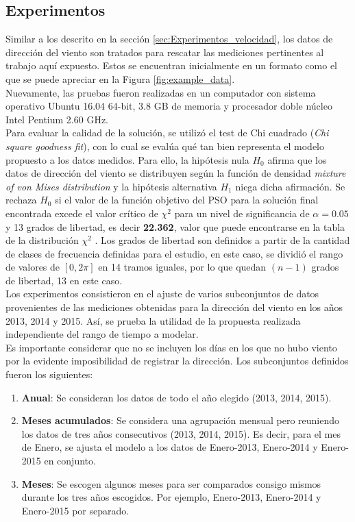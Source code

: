 \subsection{Experimentos}
Similar a los descrito en la sección \ref{sec:Experimentos_velocidad}, los datos de dirección del viento son tratados para rescatar las mediciones pertinentes al trabajo aquí expuesto. Estos se encuentran inicialmente en un formato como el que se puede apreciar en la Figura \ref{fig:example_data}.\\
Nuevamente, las pruebas fueron realizadas en un computador con sistema operativo Ubuntu 16.04 64-bit, 3.8 GB de memoria y procesador doble núcleo Intel Pentium 2.60 GHz.\\
Para evaluar la calidad de la solución, se utilizó el test de Chi cuadrado (\emph{Chi square goodness fit})\cite{goodFitTest}, con lo cual se evalúa qué tan bien representa el modelo propuesto a los datos medidos. Para ello, la hipótesis nula $H_0$ afirma que los datos de dirección del viento se distribuyen según la función de densidad \emph{mixture of von Mises distribution} y la hipótesis alternativa $H_1$ niega dicha afirmación. Se rechaza $H_0$ si el valor de la función objetivo del PSO para la solución final encontrada excede el valor crítico de $\chi^2$ para un nivel de significancia de $\alpha = 0.05$ y 13 grados de libertad, es decir \textbf{22.362}, valor que puede encontrarse en la tabla de la distribución $\chi^2$ \cite{chiSquareTable}. Los grados de libertad son definidos a partir de la cantidad de clases de frecuencia definidas para el estudio, en este caso, se dividió el rango de valores de $[0, 2\pi]$ en 14 tramos iguales, por lo que quedan $(n-1)$ grados de libertad, 13 en este caso.\\
Los experimentos consistieron en el ajuste de varios subconjuntos de datos provenientes de las mediciones obtenidas para la dirección del viento en los años 2013, 2014 y 2015. Así, se prueba la utilidad de la propuesta realizada independiente del rango de tiempo a modelar.\\
Es importante considerar que no se incluyen los días en los que no hubo viento por la evidente imposibilidad de registrar la dirección.
Los subconjuntos definidos fueron los siguientes:
\begin{enumerate}
    \item \textbf{Anual}: Se consideran los datos de todo el año elegido (2013, 2014, 2015).
    \item \textbf{Meses acumulados}: Se considera una agrupación mensual pero reuniendo los datos de tres años consecutivos (2013, 2014, 2015). Es decir, para el mes de Enero, se ajusta el modelo a los datos de Enero-2013, Enero-2014 y Enero-2015 en conjunto.
    \item \textbf{Meses}: Se escogen algunos meses para ser comparados consigo mismos durante los tres años escogidos. Por ejemplo, Enero-2013, Enero-2014 y Enero-2015 por separado.       
\end{enumerate}

